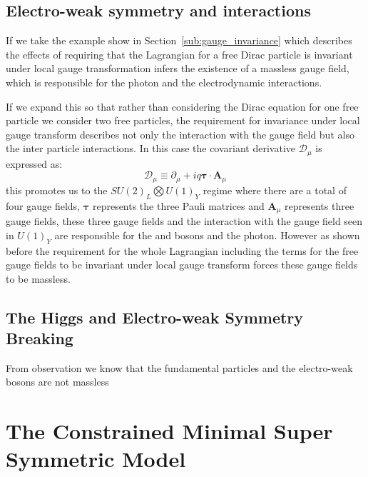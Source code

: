 \subsection{Electro-weak symmetry and interactions} %
\label{sub:electro_weak_symmetry_and_interactions}
If we take the example show in Section~\ref{sub:gauge_invariance} which 
describes the effects of requiring that the Lagrangian for a free Dirac 
particle is invariant under local gauge transformation infers the existence of 
a massless gauge field, which is responsible for the photon and the 
electrodynamic interactions.

If we expand this so that rather than considering the Dirac equation for one 
free particle we consider two free particles, the requirement for invariance 
under local gauge transform describes not only the interaction with the gauge 
field but also the inter particle interactions. In this case the covariant 
derivative $\mathcal{D}_{\mu}$ is expressed as:
\begin{equation}
  \mathcal{D}_{\mu}\equiv \partial_{\mu} + iq \bm{\tau}\cdot\bm{A}_{\mu}
\end{equation}
this promotes us to the $SU(2)_{L} \bigotimes U(1)_{Y}$ regime where there are a total of four gauge fields, $\bm{\tau}$ represents the three Pauli matrices and $\bm{A}_{\mu}$ represents three gauge fields, these three gauge fields and the interaction with the gauge field seen in $U(1)_{Y}$ are responsible for the \PW and \PZ bosons and the photon. However as shown before the requirement for the whole Lagrangian including the terms for the free gauge fields to be invariant under local gauge transform forces these gauge fields to be massless.

\subsection{The Higgs and Electro-weak Symmetry Breaking} %
\label{sub:the_higgs_and_electro_weak_symmetry_breaking}
From observation we know that the fundamental particles and the electro-weak bosons are not massless
















\section{The Constrained Minimal Super Symmetric Model} %
\label{sec:the_constrained_minimal_super_symmetric_model}


